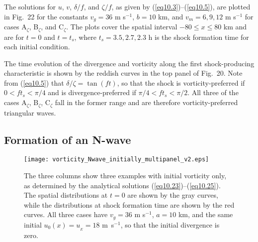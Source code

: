 \documentclass[10pt]{article}
\begin{document}
The solutions for
$u$, $v$, $\delta/f$, and $\zeta/f$, as given by (\ref{eq10.3})--(\ref{eq10.5}),
are plotted in Fig.~22 for the constants $v_g=36$ m s$^{-1}$,
$b=10$ km, and $v_m=6,9,12$ m s$^{-1}$ for cases A$_\zeta$, B$_\zeta$, and C$_\zeta$.
The plots cover the spatial interval $-80 \le x \le 80$ km and are for $t=0$ and
$t=t_s$, where $t_s=3.5, 2.7, 2.3$ h is the shock formation
time for each initial condition.

     The time evolution of the divergence and vorticity along the first
shock-producing characteristic is shown by the reddish curves in the top
panel of Fig.~20. Note from (\ref{eq10.5}) that
$\delta/\zeta = \tan(ft)$, so that the shock is vorticity-preferred if $0 < ft_s < \pi/4$
and is divergence-preferred if $\pi/4 < ft_s < \pi/2$.
All three of the cases A$_\zeta$, B$_\zeta$, C$_\zeta$ fall in the former
range and are therefore vorticity-preferred triangular waves.

\bigskip

\subsection{Formation of an N-wave}
\begin{figure*}[t]                    %
\centerline{\texttt{[image: vorticity\_Nwave\_initially\_multipanel\_v2.eps]}}
\caption{The three columns show three examples with initial vorticity only,
as determined by the analytical solutions (\ref{eq10.23})--(\ref{eq10.25}). The
spatial distributions at $t=0$ are shown by the gray curves, while the distributions
at shock formation time are shown by the red curves. All three cases have
$v_g=36$ m s$^{-1}$, $a=10$ km, and the same initial $u_0(x)=u_{_E}=18$ m~s$^{-1}$,
so that the initial divergence is zero.}
\end{figure*}
\end{document}

